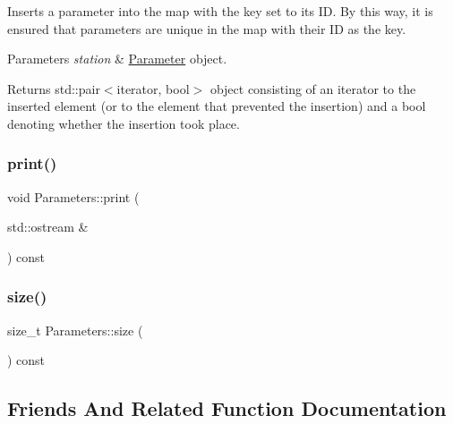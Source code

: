 Inserts a parameter into the map with the key set to its ID. By this way, it is ensured that parameters are unique in the map with their ID as the key.


\begin{DoxyParams}{Parameters}
{\em station} & \mbox{\hyperlink{class_parameter}{Parameter}} object. \\
\hline
\end{DoxyParams}
\begin{DoxyReturn}{Returns}
std\+::pair$<$iterator, bool$>$ object consisting of an iterator to the inserted element (or to the element that prevented the insertion) and a bool denoting whether the insertion took place. 
\end{DoxyReturn}
\mbox{\label{class_parameters_adff840358049658c4bb93c2b17480e74}} 
\subsubsection{\texorpdfstring{print()}{print()}}
{\footnotesize\ttfamily void Parameters\+::print (\begin{DoxyParamCaption}\item[{std\+::ostream \&}]{ }\end{DoxyParamCaption}) const}

\mbox{\label{class_parameters_a93bcd325ff5cca516148fe89fe3d1bc0}} 
\subsubsection{\texorpdfstring{size()}{size()}}
{\footnotesize\ttfamily size\+\_\+t Parameters\+::size (\begin{DoxyParamCaption}{ }\end{DoxyParamCaption}) const}



\subsection{Friends And Related Function Documentation}
\mbox{\label{class_parameters_a8ffabb0f94a5698a8a711fa5c449e622}} 
